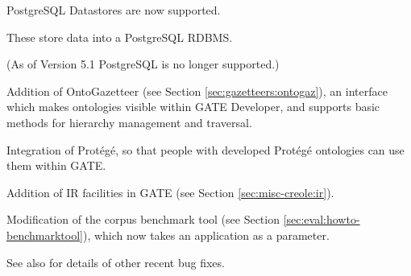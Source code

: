 PostgreSQL Datastores are now supported.

These store data into a PostgreSQL RDBMS.

(As of Version 5.1 PostgreSQL is no longer supported.)

Addition of OntoGazetteer (see Section \ref{sec:gazetteers:ontogaz}), an
interface which makes ontologies visible within GATE Developer, and
supports basic methods for hierarchy management and traversal.

Integration of Prot\'eg\'e, so that people
with developed Prot\'eg\'e ontologies can use them within GATE.

Addition of IR facilities in GATE (see Section \ref{sec:misc-creole:ir}).

Modification of the corpus benchmark tool (see Section
\ref{sec:eval:howto-benchmarktool}), which now takes an application as a
parameter.

See also  for details of other
recent bug fixes.
